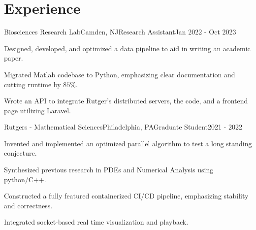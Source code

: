 \thispagestyle{empty}

\section{Experience}

\begin{role}{Biosciences Research Lab}{Camden, NJ}{Research Assistant}{Jan 2022 - Oct 2023}
  \item Designed, developed, and optimized a data pipeline to aid in writing an academic paper.
  \item Migrated Matlab codebase to Python, emphasizing clear documentation and cutting runtime by $85\%$.
  \item Wrote an API to integrate Rutger's distributed servers, the code, and a frontend page utilizing Laravel.
\end{role}

\begin{role}{Rutgers - Mathematical Sciences}{Philadelphia, PA}{Graduate Student}{2021 - 2022}
  \item Invented and implemented an optimized parallel algorithm to test a long standing conjecture.
  \item Synthesized previous research in PDEs and Numerical Analysis using python/C++.
  \item Constructed a fully featured containerized CI/CD pipeline, emphasizing stability and correctness.
  \item Integrated socket-based real time visualization and playback.
\end{role}

